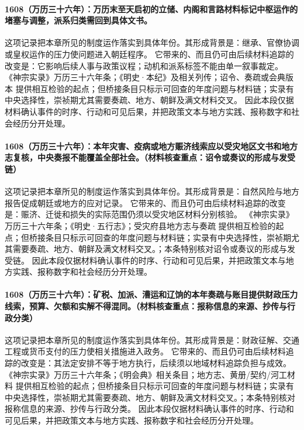 \paragraph{1608（万历三十六年）：万历末至天启初的立储、内阁和言路材料标记中枢运作的堵塞与调整，派系归类需回到具体文书。} 这项记录把本章所见的制度运作落实到具体年份。其形成背景是：继承、官僚协调或皇权运作的压力使问题进入朝廷程序。 它带来的、而且仍可由后续材料追踪的改变是：它影响后续人事与政策议程；动机和派系标签不能由单一叙事裁定。 《神宗实录》万历三十六年条；《明史·本纪》及相关列传；诏令、奏疏或会典版本 提供相互检验的起点；但桥接条目只标示可回查的年度问题与材料链；实录有中央选择性，崇祯期尤其需要奏疏、地方、朝鲜及满文材料交叉。 因此本段仅据材料确认事件的时序、行动和可见后果，并把政策文本与地方实践、报称数字和社会经历分开处理。

\paragraph{1608（万历三十六年）：本年灾害、疫病或地方赈济线索应以受灾地区文书和地方志复核，中央奏报不能覆盖全部社会。（材料核查重点：诏令或奏议的形成与发受链）} 这项记录把本章所见的制度运作落实到具体年份。其形成背景是：自然风险与地方报告促成朝廷或地方的应对记录。 它带来的、而且仍可由后续材料追踪的改变是：赈济、迁徙和损失的实际范围仍须以受灾地区材料分别核验。 《神宗实录》万历三十六年条；《明史·五行志》；受灾府县地方志与奏疏 提供相互检验的起点；但桥接条目只标示可回查的年度问题与材料链；实录有中央选择性，崇祯期尤其需要奏疏、地方、朝鲜及满文材料交叉。；本条特别核对诏令或奏议的形成与发受链。 因此本段仅据材料确认事件的时序、行动和可见后果，并把政策文本与地方实践、报称数字和社会经历分开处理。

\paragraph{1608（万历三十六年）：矿税、加派、漕运和辽饷的本年奏疏与账目提供财政压力线索，预算、欠额和实解不得混同。（材料核查重点：报称信息的来源、抄传与行政分类）} 这项记录把本章所见的制度运作落实到具体年份。其形成背景是：财政征解、交通工程或货币支付的压力使相关措施进入政务。 它带来的、而且仍可由后续材料追踪的改变是：其法定安排不等于地方执行，后续须以地域材料追踪负担与成效。 《神宗实录》万历三十六年条；《明会典》相关条目；地方志、黄册/契约/河工材料 提供相互检验的起点；但桥接条目只标示可回查的年度问题与材料链；实录有中央选择性，崇祯期尤其需要奏疏、地方、朝鲜及满文材料交叉。；本条特别核对报称信息的来源、抄传与行政分类。 因此本段仅据材料确认事件的时序、行动和可见后果，并把政策文本与地方实践、报称数字和社会经历分开处理。

